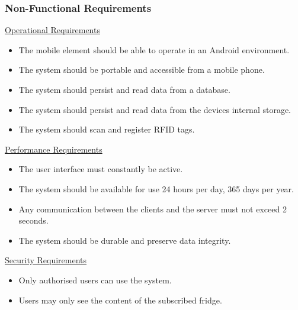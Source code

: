 \documentclass[a4paper, 11pt]{article}
\begin{document}
\subsubsection{Non-Functional Requirements}
\underline{Operational Requirements}
\begin{itemize}
  \item The mobile element should be able to operate in an Android environment. 
  \item The system should be portable and accessible from a mobile phone.
  \item The system should persist and read data from a database. 
    \item The system should persist and read data from the devices internal storage. 
  \item The system should scan and register RFID tags.
\end{itemize}
\underline{Performance Requirements}
\begin{itemize}
  \item The user interface must constantly be active.
  \item The system should be available for use 24 hours per day, 365 days per year.
  \item Any communication between the clients and the server must not exceed 2 seconds.
  \item The system should be durable and preserve data integrity.
\end{itemize}
\underline{Security Requirements}
\begin{itemize}
  \item Only authorised users can use the system.
  \item Users may only see the content of the subscribed fridge.
\end{itemize}

\vspace{\baselineskip}
\end{document}
